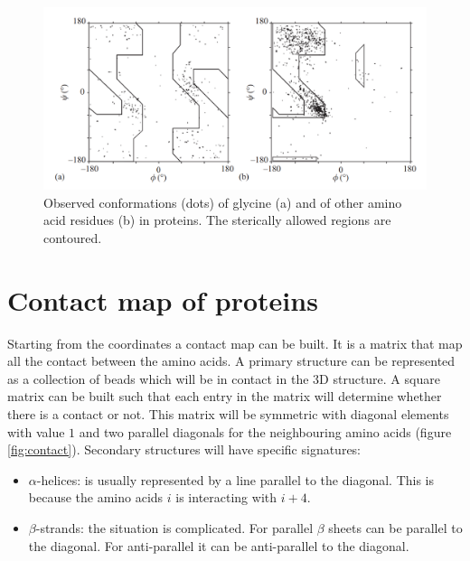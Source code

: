 		\begin{figure}[H]
			\centering
			\includegraphics[width=\textwidth]{ala_gly.png}
			\caption{Observed conformations (dots) of glycine (a) and of other amino acid residues (b) in proteins. The sterically allowed regions are contoured.}
			\label{fig:ala_gly}
		\end{figure}


\section{Contact map of proteins}
Starting from the coordinates a contact map can be built.
It is a matrix that map all the contact between the amino acids.
A primary structure can be represented as a collection of beads which will be in contact in the 3D structure.
A square matrix can be built such that each entry in the matrix will determine whether there is a contact or not.
This matrix will be symmetric with diagonal elements with value $1$ and two parallel diagonals for the neighbouring amino acids (figure \ref{fig:contact}).
Secondary structures will have specific signatures:

\begin{multicols}{2}
	\begin{itemize}
		\item $\alpha$-helices: is usually represented by a line parallel to the diagonal.
			This is because the amino acids $i$ is interacting with $i+4$.
		\item $\beta$-strands: the situation is complicated.
			For parallel $\beta$ sheets can be parallel to the diagonal.
			For anti-parallel it can be anti-parallel to the diagonal.
	\end{itemize}
\end{multicols}


